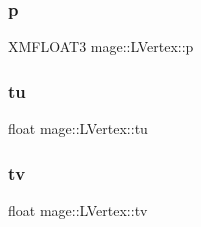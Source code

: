 \subsubsection{\texorpdfstring{p}{p}}
{\footnotesize\ttfamily X\+M\+F\+L\+O\+A\+T3 mage\+::\+L\+Vertex\+::p}

\hypertarget{structmage_1_1_l_vertex_a820b1dba91a65e4be9a41c4297970dd6}{}\label{structmage_1_1_l_vertex_a820b1dba91a65e4be9a41c4297970dd6} 
\subsubsection{\texorpdfstring{tu}{tu}}
{\footnotesize\ttfamily float mage\+::\+L\+Vertex\+::tu}

\hypertarget{structmage_1_1_l_vertex_ab5e712d5befd3b8e3b58c772e6d3bf50}{}\label{structmage_1_1_l_vertex_ab5e712d5befd3b8e3b58c772e6d3bf50} 
\subsubsection{\texorpdfstring{tv}{tv}}
{\footnotesize\ttfamily float mage\+::\+L\+Vertex\+::tv}

